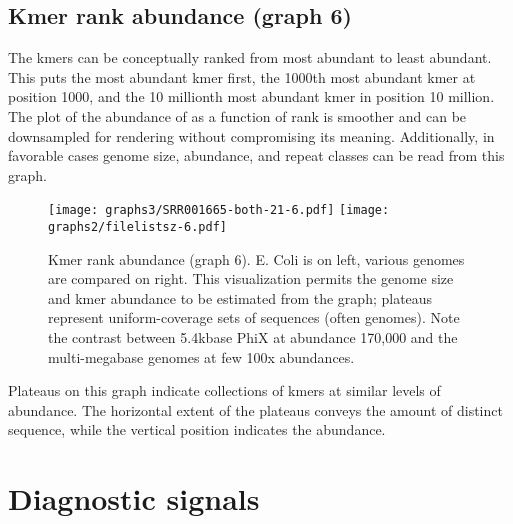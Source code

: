 \documentclass[11pt,fullpage]{article}
\begin{document}
\subsection{Kmer rank abundance (graph 6)}
The kmers can be conceptually ranked from most abundant to least abundant.  This puts the
most abundant kmer first, the 1000th most abundant kmer at position 1000, and the 10 millionth
most abundant kmer in position 10 million.  The plot of the abundance of as a function of rank
is smoother and can be downsampled for rendering without compromising its meaning.
Additionally, in favorable cases genome size, abundance, and repeat classes can be read from
this graph.

\begin{figure}
\begin{center}
\texttt{[image: graphs3/SRR001665-both-21-6.pdf]} \texttt{[image: graphs2/filelistsz-6.pdf]}
\end{center}
\caption{Kmer rank abundance (graph 6).  E. Coli is on left, various genomes are compared on right.  This visualization
permits the genome size and kmer abundance to be estimated from the graph; plateaus represent
uniform-coverage sets of sequences (often genomes).  Note the contrast between 5.4kbase PhiX
at abundance 170,000 and the multi-megabase genomes at few 100x abundances. }
\label{graph6}
\end{figure}

Plateaus on this graph indicate  collections of kmers at similar levels of abundance.  The
horizontal extent of the plateaus conveys the amount of distinct sequence, while the vertical
position indicates the abundance.

\section{Diagnostic signals}
\end{document}
